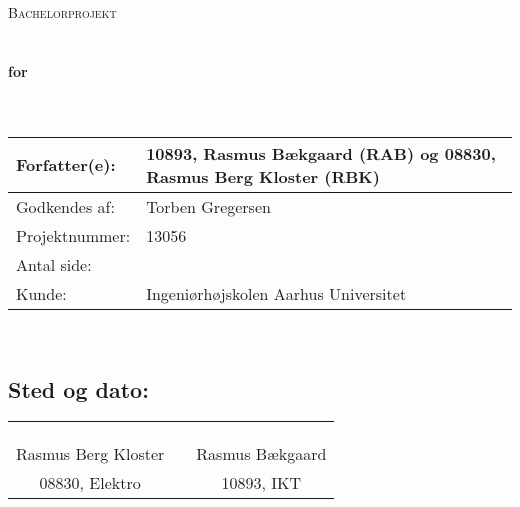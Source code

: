 \begin{center}



\textsc{\Large Bachelorprojekt}\\[0.5cm]


\HRule \\[0.4cm]

{ \huge \bfseries \DocumentType}\\[0.4cm]
{ \huge \bfseries for}\\[0.4cm] 
{ \huge \bfseries \ProjectName}\\[0.4cm]

\HRule \\[1.5cm]

\begin{tabular}{p{}|p{}}
\hline 
Forfatter(e): & 10893, Rasmus Bækgaard (RAB) og 08830, Rasmus Berg Kloster (RBK)\\ 
\hline 
Godkendes af: & Torben Gregersen \\ 
\hline
Projektnummer: & 13056\\
\hline
Antal side: & \pageref{LastPage} \\
\hline 
Kunde: & Ingeniørhøjskolen Aarhus Universitet \\
\hline
\end{tabular} 
%



\end{center}

\mbox{}\\

\subsection*{Sted og dato:}
\begin{tabular}{c p{} c}
&& \\
&& \\
\underline{\qquad \qquad \qquad \qquad \qquad \qquad \qquad} & \qquad & \underline{\qquad \qquad \qquad \qquad \qquad \qquad \qquad}  \\ 
Rasmus Berg Kloster & & Rasmus Bækgaard \\
08830, Elektro & & 10893, IKT
\end{tabular} 